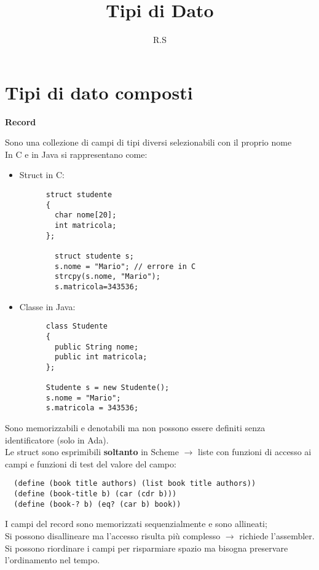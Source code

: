 \documentclass[12pt]{extarticle}
\title{Tipi di Dato}
\author{R.S}
\begin{document}
\maketitle

\section*{Tipi di dato composti}

\textbf{Record}

\begin{flushleft}

Sono una collezione di campi di tipi diversi selezionabili con il proprio nome \\    
In C e in Java si rappresentano come:
\begin{itemize}
    \item Struct in C: 
    \begin{lstlisting}
      struct studente 
      {
        char nome[20];
        int matricola; 
      };
        
        struct studente s;
        s.nome = "Mario"; // errore in C
        strcpy(s.nome, "Mario");
        s.matricola=343536;
    \end{lstlisting}
    \item Classe in Java:
    \begin{lstlisting}
      class Studente 
      {
        public String nome;
        public int matricola;
      };
      
      Studente s = new Studente();
      s.nome = "Mario";
      s.matricola = 343536;
    \end{lstlisting}
\end{itemize}

Sono memorizzabili e denotabili ma non possono essere definiti senza identificatore (solo in Ada). \\
Le struct sono esprimibili \textbf{soltanto} in Scheme $\rightarrow$ liste con funzioni di accesso ai campi e 
funzioni di test del valore del campo:

\begin{lstlisting}
  (define (book title authors) (list book title authors))
  (define (book-title b) (car (cdr b)))
  (define (book-? b) (eq? (car b) book))
\end{lstlisting}

I campi del record sono memorizzati sequenzialmente e sono allineati; \\
Si possono disallineare ma l'accesso risulta più complesso $\rightarrow$ richiede l'assembler. \\
Si possono riordinare i campi per risparmiare spazio ma bisogna preservare l'ordinamento nel tempo.


\end{flushleft}
\end{document}
